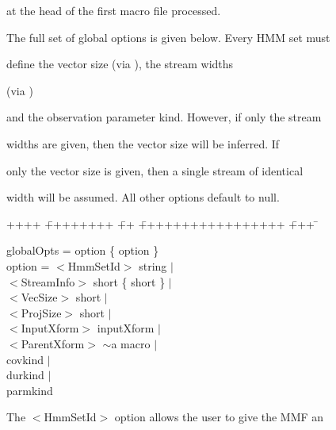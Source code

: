 at the head of the first macro file processed.





The full set of global options is given below.  Every HMM set must


define the vector size (via ), the stream widths  


(via )


and the observation parameter kind.  However, if only the stream


widths are given, then the vector size will be inferred.  If


only the vector size is given, then a single stream of identical


width will be assumed.  All other options default to null.


{\sf


\begin{tabbing}


++++ \= ++++++++ \= ++ \= +++++++++++++++++ \= +++ \=  \kill


\> globalOpts = \> option \{ option \} \\


\>  option = \> $<$HmmSetId$>$ string $|$ \\ 


\>\>  $<$StreamInfo$>$ short \{ short \} $|$  \\


\>\>   $<$VecSize$>$    short $|$  \\


\>\>   $<$ProjSize$>$    short $|$  \\


\>\>   $<$InputXform$>$ inputXform $|$  \\


\>\>   $<$ParentXform$>$ $\sim$a macro $|$  \\


\>\>   covkind $|$ \\


\>\>   durkind $|$ \\


\>\>   parmkind 


\end{tabbing}


}


\noindent


The {\sf $<$HmmSetId$>$} option allows the user to give the MMF an


